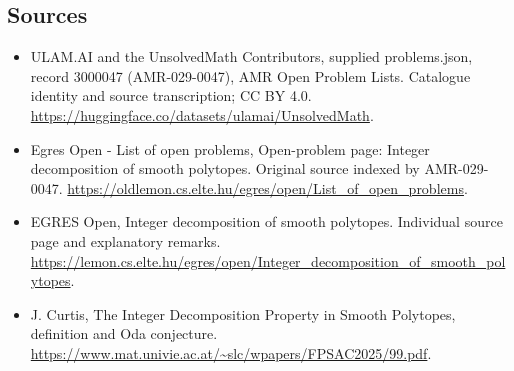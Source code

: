 \documentclass[11pt,a4paper]{article}
\begin{document}
\subsection{Sources}
\begin{itemize}
\item[S1] ULAM.AI and the UnsolvedMath Contributors, supplied problems.json, record 3000047 (AMR-029-0047), AMR Open Problem Lists. Catalogue identity and source transcription; CC BY 4.0.
\url{https://huggingface.co/datasets/ulamai/UnsolvedMath}.
\item[S2] Egres Open - List of open problems, Open-problem page: Integer decomposition of smooth polytopes. Original source indexed by AMR-029-0047.
\url{https://oldlemon.cs.elte.hu/egres/open/List_of_open_problems}.
\item[S3] EGRES Open, Integer decomposition of smooth polytopes. Individual source page and explanatory remarks.
\url{https://lemon.cs.elte.hu/egres/open/Integer_decomposition_of_smooth_polytopes}.
\item[S4] J. Curtis, The Integer Decomposition Property in Smooth Polytopes, definition and Oda conjecture.
\url{https://www.mat.univie.ac.at/~slc/wpapers/FPSAC2025/99.pdf}.
\end{itemize}
\end{document}
